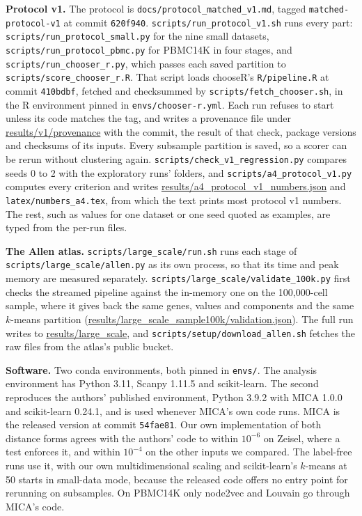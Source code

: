 \textbf{Protocol v1.} The protocol is \texttt{docs/protocol\_matched\_v1.md}, tagged
\texttt{matched-protocol-v1} at commit \texttt{620f940}. \texttt{scripts/run\_protocol\_v1.sh} runs every
part: \texttt{scripts/run\_protocol\_small.py} for the nine small datasets,
\texttt{scripts/run\_protocol\_pbmc.py} for PBMC14K in four stages, and
\texttt{scripts/run\_chooser\_r.py}, which passes each saved partition to
\texttt{scripts/score\_chooser\_r.R}. That script loads chooseR's \texttt{R/pipeline.R} at commit
\texttt{410bdbf}, fetched and checksummed by \texttt{scripts/fetch\_chooser.sh}, in the R environment
pinned in \texttt{envs/chooser-r.yml}. Each run refuses to start unless its code matches the tag, and
writes a provenance file under \url{results/v1/provenance} with the commit, the result of that check,
package versions and checksums of its inputs. Every subsample partition is saved, so a scorer can be
rerun without clustering again. \texttt{scripts/check\_v1\_regression.py} compares seeds 0 to 2 with
the exploratory runs' folders, and \texttt{scripts/a4\_protocol\_v1.py} computes every criterion and writes
\url{results/a4_protocol_v1_numbers.json} and \texttt{latex/numbers\_a4.tex}, from which the text
prints most protocol v1 numbers. The rest, such as values for one dataset or one seed quoted as
examples, are typed from the per-run files.

\textbf{The Allen atlas.} \texttt{scripts/large\_scale/run.sh} runs each stage of
\texttt{scripts/large\_scale/allen.py} as its own process, so that its time and peak memory are measured
separately. \texttt{scripts/large\_scale/validate\_100k.py} first checks the streamed pipeline against
the in-memory one on the 100,000-cell sample, where it gives back the same genes, values and components
and the same $k$-means partition (\url{results/large_scale_sample100k/validation.json}). The full run
writes to \url{results/large_scale}, and \texttt{scripts/setup/download\_allen.sh} fetches the raw files from
the atlas's public bucket.

\textbf{Software.} Two conda environments, both pinned in \texttt{envs/}. The analysis
environment has Python 3.11, Scanpy 1.11.5 and scikit-learn. The second reproduces the
authors' published environment, Python 3.9.2 with MICA 1.0.0 and scikit-learn 0.24.1, and
is used whenever MICA's own code runs. MICA is the released version at commit
\texttt{54fae81}. Our own implementation of both distance forms agrees with the authors' code to within
$10^{-6}$ on Zeisel, where a test enforces it, and within $10^{-4}$ on the other inputs we compared. The label-free runs use it, with our own multidimensional scaling and scikit-learn's $k$-means at 50 starts in small-data mode, because the released code offers no entry point for rerunning on subsamples. On PBMC14K only node2vec and Louvain go through MICA's code.

